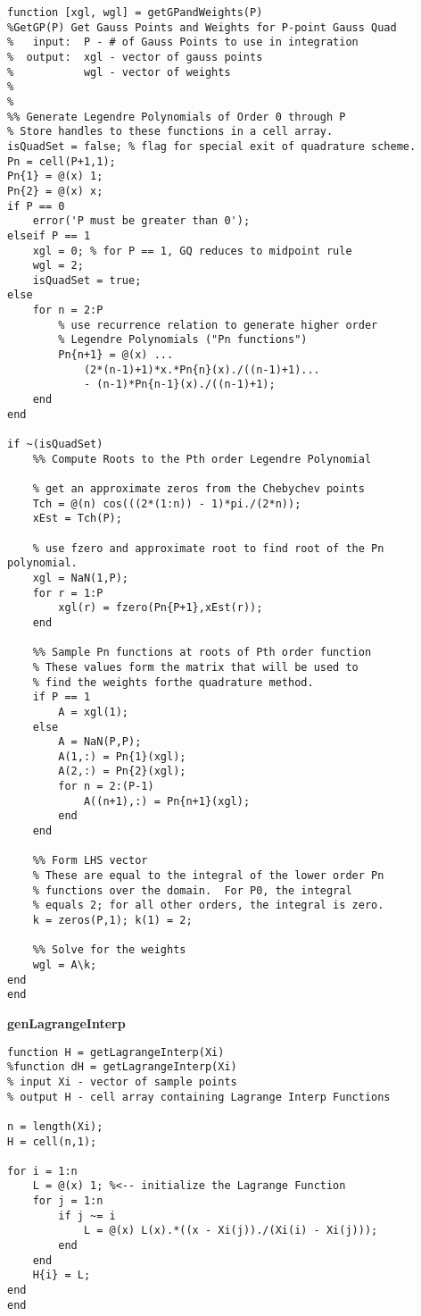 \begin{lstlisting}[style=myMatlab,name=lec34n-ex2]
function [xgl, wgl] = getGPandWeights(P)
%GetGP(P) Get Gauss Points and Weights for P-point Gauss Quad
%   input:  P - # of Gauss Points to use in integration
%  output:  xgl - vector of gauss points
%           wgl - vector of weights
%
%
%% Generate Legendre Polynomials of Order 0 through P
% Store handles to these functions in a cell array.
isQuadSet = false; % flag for special exit of quadrature scheme.
Pn = cell(P+1,1);
Pn{1} = @(x) 1;
Pn{2} = @(x) x;
if P == 0
    error('P must be greater than 0');
elseif P == 1
    xgl = 0; % for P == 1, GQ reduces to midpoint rule 
    wgl = 2;
    isQuadSet = true;
else
    for n = 2:P
        % use recurrence relation to generate higher order 
        % Legendre Polynomials ("Pn functions")
        Pn{n+1} = @(x) ...
            (2*(n-1)+1)*x.*Pn{n}(x)./((n-1)+1)...
            - (n-1)*Pn{n-1}(x)./((n-1)+1);
    end
end

if ~(isQuadSet)
    %% Compute Roots to the Pth order Legendre Polynomial
    
    % get an approximate zeros from the Chebychev points
    Tch = @(n) cos(((2*(1:n)) - 1)*pi./(2*n));
    xEst = Tch(P);
    
    % use fzero and approximate root to find root of the Pn polynomial.
    xgl = NaN(1,P);
    for r = 1:P
        xgl(r) = fzero(Pn{P+1},xEst(r));
    end
    
    %% Sample Pn functions at roots of Pth order function
    % These values form the matrix that will be used to 
    % find the weights forthe quadrature method.
    if P == 1
        A = xgl(1);
    else
        A = NaN(P,P);
        A(1,:) = Pn{1}(xgl);
        A(2,:) = Pn{2}(xgl);
        for n = 2:(P-1)
            A((n+1),:) = Pn{n+1}(xgl);
        end
    end
    
    %% Form LHS vector
    % These are equal to the integral of the lower order Pn 
    % functions over the domain.  For P0, the integral 
    % equals 2; for all other orders, the integral is zero.
    k = zeros(P,1); k(1) = 2;
    
    %% Solve for the weights
    wgl = A\k;
end
end
\end{lstlisting}

\vspace{1.5cm}

\noindent\textbf{genLagrangeInterp}

\begin{lstlisting}[style=myMatlab,name=lec34n-ex2]
function H = getLagrangeInterp(Xi)
%function dH = getLagrangeInterp(Xi)
% input Xi - vector of sample points
% output H - cell array containing Lagrange Interp Functions

n = length(Xi);
H = cell(n,1);

for i = 1:n
    L = @(x) 1; %<-- initialize the Lagrange Function
    for j = 1:n
        if j ~= i
            L = @(x) L(x).*((x - Xi(j))./(Xi(i) - Xi(j)));
        end
    end
    H{i} = L;
end
end
\end{lstlisting}

